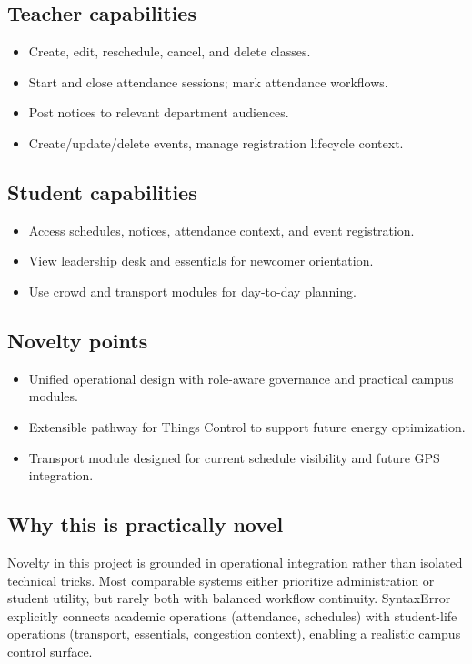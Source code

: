 \documentclass[conference]{IEEEtran}
\begin{document}
\subsection{Teacher capabilities}
\begin{itemize}
    \item Create, edit, reschedule, cancel, and delete classes.
    \item Start and close attendance sessions; mark attendance workflows.
    \item Post notices to relevant department audiences.
    \item Create/update/delete events, manage registration lifecycle context.
\end{itemize}

\subsection{Student capabilities}
\begin{itemize}
    \item Access schedules, notices, attendance context, and event registration.
    \item View leadership desk and essentials for newcomer orientation.
    \item Use crowd and transport modules for day-to-day planning.
\end{itemize}

\subsection{Novelty points}
\begin{itemize}
    \item Unified operational design with role-aware governance and practical campus modules.
    \item Extensible pathway for Things Control to support future energy optimization.
    \item Transport module designed for current schedule visibility and future GPS integration.
\end{itemize}

\subsection{Why this is practically novel}
Novelty in this project is grounded in operational integration rather than isolated technical tricks. Most comparable systems either prioritize administration or student utility, but rarely both with balanced workflow continuity. SyntaxError explicitly connects academic operations (attendance, schedules) with student-life operations (transport, essentials, congestion context), enabling a realistic campus control surface.
\end{document}
